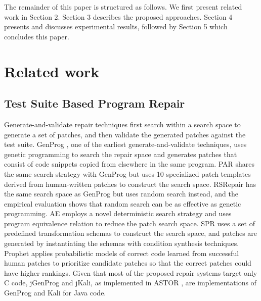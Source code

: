 \documentclass[]{sig-alternate}
\begin{document}
The remainder of this paper is structured as follows. We first present related work in Section 2. Section 3 describes the proposed approaches. Section 4 presents and discusses experimental results, followed by Section 5 which concludes this paper. 



\section{Related work}

\subsection{Test Suite Based Program Repair}
Generate-and-validate repair techniques first search within a search space to generate a set of patches, and then validate the generated patches against the test suite. GenProg \cite{genprog}, one of the earliest generate-and-validate techniques, uses genetic programming to search the repair space and generates patches that consist of code snippets copied from elsewhere in the same program.  PAR \cite{kim2013automatic} shares the same search strategy with GenProg but uses 10 specialized patch templates derived from human-written patches to construct the search space. RSRepair \cite{rsrepair} has the same search space as GenProg but uses random search instead, and the empirical evaluation shows that random search can be as effective as genetic programming. AE \cite{6693094} employs a novel deterministic search strategy and uses program equivalence relation to reduce the patch search space. SPR \cite{spr} uses a set of predefined transformation schemas to construct the search space, and patches are generated by instantiating the schemas with condition synthesis techniques. Prophet \cite{prophet} applies probabilistic models of correct code learned from successful human patches to prioritize candidate patches so that the correct patches could have higher rankings. Given that most of the proposed repair systems target only C code, jGenProg and jKali, as implemented in ASTOR \cite{astor2016}, are implementations of GenProg and Kali for Java code. 
\end{document}
